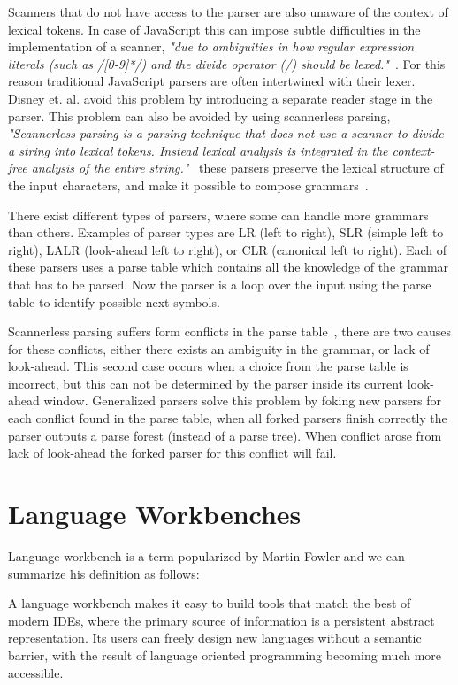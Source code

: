 Scanners that do not have access to the parser are also unaware of the context of lexical tokens. In case of JavaScript this can impose subtle difficulties in the implementation of a scanner, \textit{"due to ambiguities in how regular expression literals (such as /[0-9]*/) and the divide operator (/) should be lexed."}~\cite{Disney2014}. For this reason traditional JavaScript parsers are often intertwined with their lexer. Disney et. al. avoid this problem by introducing a separate reader stage in the parser. This problem can also be avoided by using scannerless parsing, \textit{"Scannerless parsing is a parsing technique that does not use a scanner to divide a string into lexical tokens. Instead lexical analysis is integrated in the context-free analysis of the entire string."}~\cite{Visser1997} these parsers preserve the lexical structure of the input characters, and make it possible to compose grammars~\cite{Visser1997}.

There exist different types of parsers, where some can handle more grammars than others. Examples of parser types are LR (left to right), SLR (simple left to right), LALR (look-ahead left to right), or CLR (canonical left to right). Each of these parsers uses a parse table which contains all the knowledge of the grammar that has to be parsed. Now the parser is a loop over the input using the parse table to identify possible next symbols.

Scannerless parsing suffers form conflicts in the parse table~\cite{Visser1997}, there are two causes for these conflicts, either there exists an ambiguity in the grammar, or lack of look-ahead. This second case occurs when a choice from the parse table is incorrect, but this can not be determined by the parser inside its current look-ahead window. Generalized parsers solve this problem by foking new parsers for each conflict found in the parse table, when all forked parsers finish correctly the parser outputs a parse forest (instead of a parse tree). When conflict arose from lack of look-ahead the forked parser for this conflict will fail.

\section{Language Workbenches} \label{rascal}

Language workbench is a term popularized by Martin Fowler and we can summarize his definition as follows:

A language workbench makes it easy to build tools that match the best of modern IDEs, where the primary source of information is a persistent abstract representation. Its users can freely design new languages without a semantic barrier, with the result of language oriented programming becoming much more accessible.~\cite{Fowler2005}

